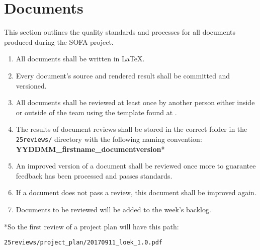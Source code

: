 \section{Documents}
This section outlines the quality standards and processes for all documents produced during the SOFA project.

\begin{enumerate}
	\item All documents shall be written in LaTeX.
	\item Every document's source and rendered result shall be committed and versioned.
	\item All documents shall be reviewed at least once by another person either inside or outside of the team using the template found at .
	\item The results of document reviews shall be stored in the correct folder in the \texttt{25reviews/} directory with the following naming convention:\\
	\textbf{YYDDMM\_firstname\_documentversion}*
	\item An improved version of a document shall be reviewed once more to guarantee feedback has been processed and passes standards.
	\item If a document does not pass a review, this document shall be improved again.
	\item Documents to be reviewed will be added to the week's backlog.
\end{enumerate}

*So the first review of a project plan will have this path:

\texttt{25reviews/project\_plan/20170911\_loek\_1.0.pdf}